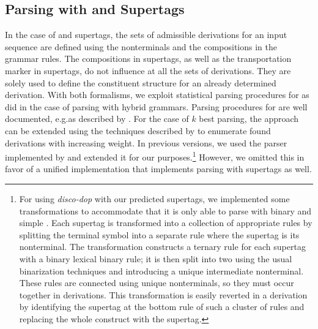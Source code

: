 \documentclass[../../document.tex]{subfiles}
\begin{document}
    \subsection{Parsing with  and  Supertags}\label{sec:parsing:lcfrs}
    In the case of  and  supertags, the sets of admissible derivations for an input sequence are defined using the nonterminals and the  compositions in the grammar rules.
    The  compositions in  supertags, as well as the transportation marker in  supertags, do not influence at all the sets of derivations.
    They are solely used to define the constituent structure for an already determined derivation.
    With both formalisms, we exploit statistical parsing procedures for  as \citet{Geb20} did in the case of parsing with hybrid grammars.
    Parsing procedures for  are well documented, e.g.\@ as described by \citet[Section~7.1]{Kal10}.
    For the case of \(k\) best parsing, the approach can be extended using the techniques described by \citet{HuaChia05} to enumerate found derivations with increasing weight.
    In previous versions, we used the  parser implemented by \citet{CraSchBod16} and extended it for our purposes.\footnote{
        For using \emph{disco-dop} with our predicted supertags, we implemented some transformations to accommodate that it is only able to parse with binary and simple .
        Each supertag is transformed into a collection of appropriate rules by splitting the terminal symbol into a separate rule where the supertag is its  nonterminal.
        The transformation constructs a ternary rule for each supertag with a binary lexical binary rule; it is then split into two using the usual binarization techniques and introducing a unique intermediate nonterminal.
        These rules are connected using unique nonterminals, so they must occur together in derivations.
        This transformation is easily reverted in a derivation by identifying the supertag at the bottom rule of such a cluster of rules and replacing the whole construct with the supertag.
    }
    However, we omitted this in favor of a unified implementation that implements parsing with  supertags as well.
\end{document}
